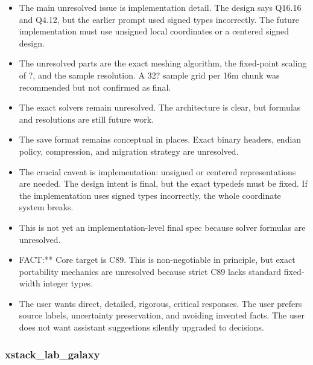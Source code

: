 \documentclass[11pt,a4paper]{report}
\begin{document}
\begin{itemize}
\item The main unresolved issue is implementation detail. The design says Q16.16 and Q4.12, but the earlier prompt used signed types incorrectly. The future implementation must use unsigned local coordinates or a centered signed design.
\item The unresolved parts are the exact meshing algorithm, the fixed-point scaling of ?, and the sample resolution. A 32? sample grid per 16m chunk was recommended but not confirmed as final.
\item The exact solvers remain unresolved. The architecture is clear, but formulas and resolutions are still future work.
\item The save format remains conceptual in places. Exact binary headers, endian policy, compression, and migration strategy are unresolved.
\item The crucial caveat is implementation: unsigned or centered representations are needed. The design intent is final, but the exact typedefs must be fixed. If the implementation uses signed types incorrectly, the whole coordinate system breaks.
\item This is not yet an implementation-level final spec because solver formulas are unresolved.
\item FACT:** Core target is C89. This is non-negotiable in principle, but exact portability mechanics are unresolved because strict C89 lacks standard fixed-width integer types.
\item The user wants direct, detailed, rigorous, critical responses. The user prefers source labels, uncertainty preservation, and avoiding invented facts. The user does not want assistant suggestions silently upgraded to decisions.
\end{itemize}

\subsubsection{xstack\_lab\_galaxy}
\end{document}
